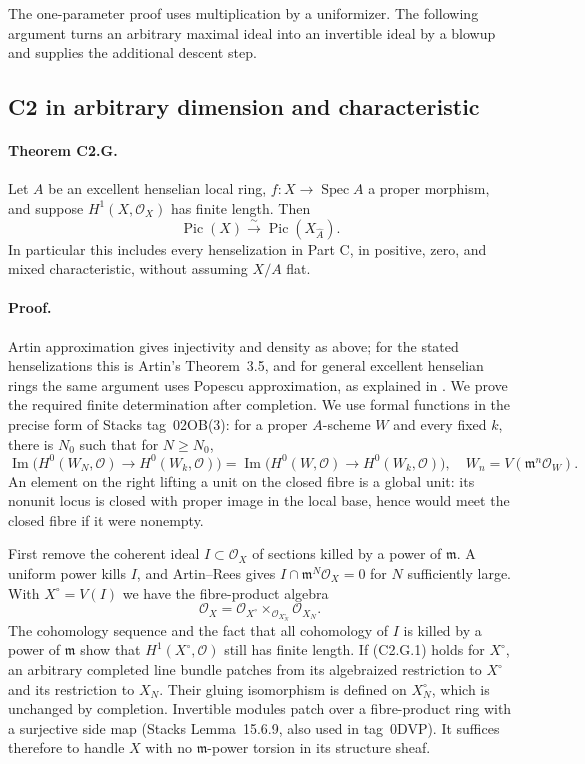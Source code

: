The one-parameter proof uses multiplication by a uniformizer. The following
argument turns an arbitrary maximal ideal into an invertible ideal by a
blowup and supplies the additional descent step.

\subsection{C2 in arbitrary dimension and characteristic}

\paragraph{Theorem C2.G.}
Let $A$ be an excellent henselian local ring, $f:X\to\operatorname{Spec}A$
a proper morphism, and suppose $H^1(X,\mathcal O_X)$ has finite length.
Then
\[
 \operatorname{Pic}(X)\xrightarrow{\sim}
 \operatorname{Pic}(X_{\widehat A}).                 \tag{C2.G.1}
\]
In particular this includes every henselization in Part C, in positive,
zero, and mixed characteristic, without assuming $X/A$ flat.

\paragraph{Proof.}
Artin approximation gives injectivity and density as above; for the stated
henselizations this is Artin's Theorem~3.5, and for general excellent
henselian rings the same argument uses Popescu approximation, as explained
in \cite[Remark~1.3]{PerlingSchroer2017}. We prove the required finite
determination after completion. We use formal functions in the precise
form of Stacks tag~02OB(3): for a proper $A$-scheme $W$ and every fixed
$k$, there is $N_0$ such that for $N\geq N_0$,
\[
 \operatorname{Im}\bigl(H^0(W_N,\mathcal O)\to H^0(W_k,\mathcal O)\bigr)
 =\operatorname{Im}\bigl(H^0(W,\mathcal O)\to H^0(W_k,\mathcal O)\bigr),
 \quad W_n=V(\mathfrak m^n\mathcal O_W).             \tag{C2.G.2}
\]
An element on the right lifting a unit on the closed fibre is a global unit:
its nonunit locus is closed with proper image in the local base, hence
would meet the closed fibre if it were nonempty.

First remove the coherent ideal $I\subset\mathcal O_X$ of sections killed
by a power of $\mathfrak m$. A uniform power kills $I$, and Artin--Rees
gives $I\cap\mathfrak m^N\mathcal O_X=0$ for $N$ sufficiently large.
With $X^\circ=V(I)$ we have the fibre-product algebra
\[
 \mathcal O_X=
 \mathcal O_{X^\circ}\times_{\mathcal O_{X^\circ_N}}\mathcal O_{X_N}.
\tag{C2.G.3}
\]
The cohomology sequence and the fact that all cohomology of $I$ is killed
by a power of $\mathfrak m$ show that $H^1(X^\circ,\mathcal O)$ still has
finite length. If (C2.G.1) holds for $X^\circ$, an arbitrary completed line
bundle patches from its algebraized restriction to $X^\circ$ and its
restriction to $X_N$. Their gluing isomorphism is defined on
$X^\circ_N$, which is unchanged by completion. Invertible modules patch
over a fibre-product ring with a surjective side map (Stacks
Lemma~15.6.9, also used in tag~0DVP). It suffices therefore to handle $X$
with no $\mathfrak m$-power torsion in its structure sheaf.

